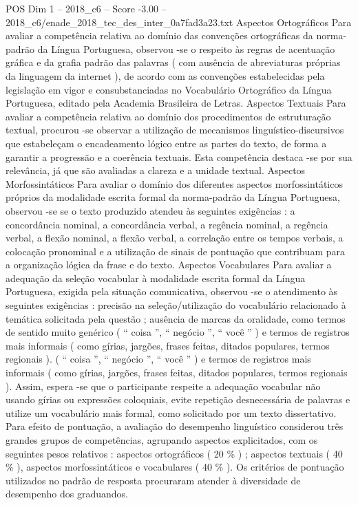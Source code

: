 \begin{textsample}{POS Dim 1 – 2018\_c6 – Score -3.00 – 2018\_c6/enade\_2018\_tec\_des\_inter\_0a7fad3a23.txt}
Aspectos Ortográficos Para avaliar a competência relativa ao domínio das convenções ortográficas da norma-padrão da Língua Portuguesa, observou -se o respeito às regras de acentuação gráfica e da grafia padrão das palavras ( com ausência de abreviaturas próprias da linguagem da internet ), de acordo com as convenções estabelecidas pela legislação em vigor e consubstanciadas no Vocabulário Ortográfico da Língua Portuguesa, editado pela Academia Brasileira de Letras.
Aspectos Textuais Para avaliar a competência relativa ao domínio dos procedimentos de estruturação textual, procurou -se observar a utilização de mecanismos linguístico-discursivos que estabeleçam o encadeamento lógico entre as partes do texto, de forma a garantir a progressão e a coerência textuais.
Esta competência destaca -se por sua relevância, já que são avaliadas a clareza e a unidade textual.
Aspectos Morfossintáticos Para avaliar o domínio dos diferentes aspectos morfossintáticos próprios da modalidade escrita formal da norma-padrão da Língua Portuguesa, observou -se se o texto produzido atendeu às seguintes exigências : a concordância nominal, a concordância verbal, a regência nominal, a regência verbal, a flexão nominal, a flexão verbal, a correlação entre os tempos verbais, a colocação pronominal e a utilização de sinais de pontuação que contribuam para a organização lógica da frase e do texto.
Aspectos Vocabulares Para avaliar a adequação da seleção vocabular à modalidade escrita formal da Língua Portuguesa, exigida pela situação comunicativa, observou -se o atendimento às seguintes exigências : precisão na seleção/utilização do vocabulário relacionado à temática solicitada pela questão ; ausência de marcas da oralidade, como termos de sentido muito genérico ( “ coisa ”, “ negócio ”, “ você ” ) e termos de registros mais informais ( como gírias, jargões, frases feitas, ditados populares, termos regionais ). ( “ coisa ”, “ negócio ”, “ você ” ) e termos de registros mais informais ( como gírias, jargões, frases feitas, ditados populares, termos regionais ).
Assim, espera -se que o participante respeite a adequação vocabular não usando gírias ou expressões coloquiais, evite repetição desnecessária de palavras e utilize um vocabulário mais formal, como solicitado por um texto dissertativo.
Para efeito de pontuação, a avaliação do desempenho linguístico considerou três grandes grupos de competências, agrupando aspectos explicitados, com os seguintes pesos relativos : aspectos ortográficos ( 20 \% ) ; aspectos textuais ( 40 \% ), aspectos morfossintáticos e vocabulares ( 40 \% ).
Os critérios de pontuação utilizados no padrão de resposta procuraram atender à diversidade de desempenho dos graduandos.

\end{textsample}
